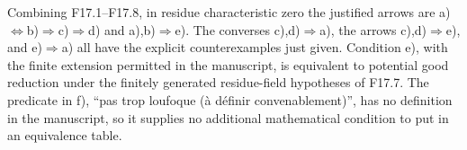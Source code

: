 Combining F17.1--F17.8, in residue characteristic zero the justified
arrows are a)$\Leftrightarrow$b)$\Rightarrow$c)$\Rightarrow$d) and
a),b)$\Rightarrow$e). The converses c),d)$\Rightarrow$a), the
arrows c),d)$\Rightarrow$e), and e)$\Rightarrow$a) all have the
explicit counterexamples just given. Condition e), with the finite
extension permitted in the manuscript, is equivalent to potential
good reduction under the finitely generated residue-field hypotheses
of F17.7. The predicate in f), ``pas
trop loufoque (\`a d\'efinir convenablement)'', has no definition
in the manuscript, so it supplies no additional mathematical
condition to put in an equivalence table.
